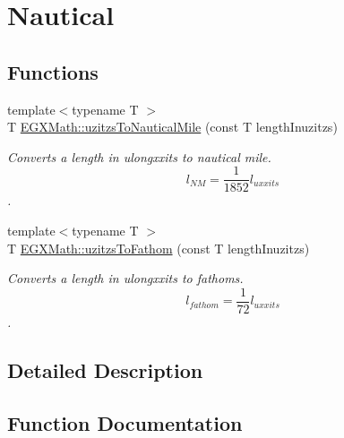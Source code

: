 \hypertarget{group___e_g_x_math-_conversions-_length_conversions-uzitzs-_nautical}{}\section{Nautical}
\label{group___e_g_x_math-_conversions-_length_conversions-uzitzs-_nautical}
\subsection*{Functions}
\begin{DoxyCompactItemize}
\item 
{\footnotesize template$<$typename T $>$ }\\T \mbox{\hyperlink{group___e_g_x_math-_conversions-_length_conversions-uzitzs-_nautical_ga71c06fc85e22f77eba0b234edefa4562}{E\+G\+X\+Math\+::uzitzs\+To\+Nautical\+Mile}} (const T length\+Inuzitzs)
\begin{DoxyCompactList}\small\item\em Converts a length in ulongxxits to nautical mile. \[ l_{NM}= \frac{1}{1852} l_{uxxits} \]. \end{DoxyCompactList}\item 
{\footnotesize template$<$typename T $>$ }\\T \mbox{\hyperlink{group___e_g_x_math-_conversions-_length_conversions-uzitzs-_nautical_gaaff17ba6c6a9c899108fccf746059d03}{E\+G\+X\+Math\+::uzitzs\+To\+Fathom}} (const T length\+Inuzitzs)
\begin{DoxyCompactList}\small\item\em Converts a length in ulongxxits to fathoms. \[ l_{fathom}= \frac{1}{72} l_{uxxits} \]. \end{DoxyCompactList}\end{DoxyCompactItemize}


\subsection{Detailed Description}


\subsection{Function Documentation}
\mbox{\label{group___e_g_x_math-_conversions-_length_conversions-uzitzs-_nautical_gaaff17ba6c6a9c899108fccf746059d03}} 
